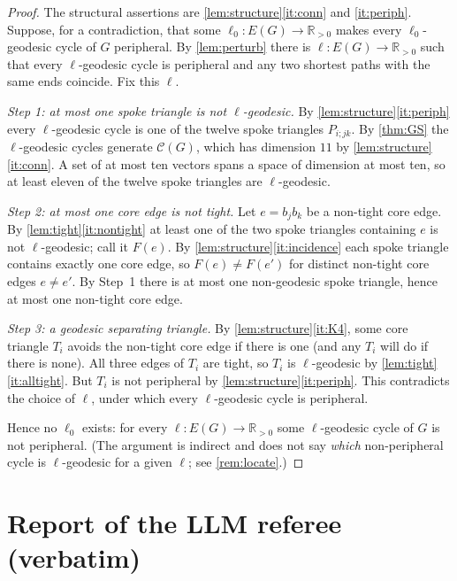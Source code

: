 \documentclass[11pt,a4paper]{article}
\theoremstyle{plain}
\theoremstyle{definition}
\theoremstyle{remark}
\newcommand{\R}{\mathbb R}
\newcommand{\cyc}{\mathcal C}
\begin{document}
\label{pf:main}
\thmmain*
\begin{proof}
The structural assertions are \cref{lem:structure}\ref{it:conn} and \ref{it:periph}. Suppose, for a contradiction, that some $\ell_0\colon E(G)\to\R_{>0}$ makes every $\ell_0$-geodesic cycle of $G$ peripheral. By \cref{lem:perturb} there is $\ell\colon E(G)\to\R_{>0}$ such that every $\ell$-geodesic cycle is peripheral and any two shortest paths with the same ends coincide. Fix this $\ell$.

\emph{Step 1: at most one spoke triangle is not $\ell$-geodesic.} By \cref{lem:structure}\ref{it:periph} every $\ell$-geodesic cycle is one of the twelve spoke triangles $P_{i;jk}$. By \cref{thm:GS} the $\ell$-geodesic cycles generate $\cyc(G)$, which has dimension $11$ by \cref{lem:structure}\ref{it:conn}. A set of at most ten vectors spans a space of dimension at most ten, so at least eleven of the twelve spoke triangles are $\ell$-geodesic.

\emph{Step 2: at most one core edge is not tight.} Let $e=b_jb_k$ be a non-tight core edge. By \cref{lem:tight}\ref{it:nontight} at least one of the two spoke triangles containing $e$ is not $\ell$-geodesic; call it $F(e)$. By \cref{lem:structure}\ref{it:incidence} each spoke triangle contains exactly one core edge, so $F(e)\ne F(e')$ for distinct non-tight core edges $e\ne e'$. By Step~1 there is at most one non-geodesic spoke triangle, hence at most one non-tight core edge.

\emph{Step 3: a geodesic separating triangle.} By \cref{lem:structure}\ref{it:K4}, some core triangle $T_i$ avoids the non-tight core edge if there is one (and any $T_i$ will do if there is none). All three edges of $T_i$ are tight, so $T_i$ is $\ell$-geodesic by \cref{lem:tight}\ref{it:alltight}. But $T_i$ is not peripheral by \cref{lem:structure}\ref{it:periph}. This contradicts the choice of $\ell$, under which every $\ell$-geodesic cycle is peripheral.

Hence no $\ell_0$ exists: for every $\ell\colon E(G)\to\R_{>0}$ some $\ell$-geodesic cycle of $G$ is not peripheral. (The argument is indirect and does not say \emph{which} non-peripheral cycle is $\ell$-geodesic for a given $\ell$; see \cref{rem:locate}.)
\end{proof}

\section{Report of the LLM referee (verbatim)}\label{app:referee}
\end{document}
